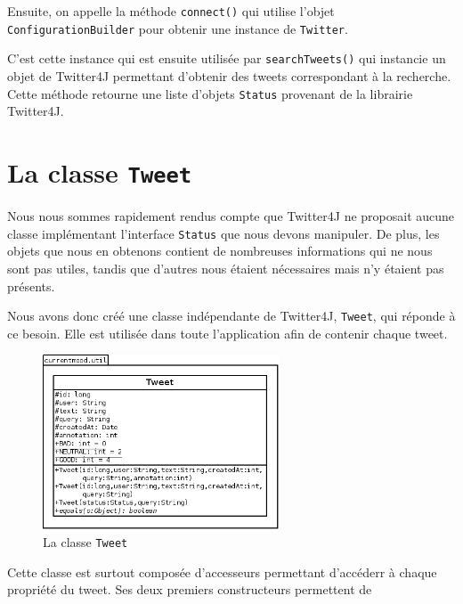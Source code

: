 \documentclass[12pt,a4paper]{report}
\begin{document}
Ensuite, on appelle la méthode \texttt{connect()} qui utilise l'objet
\texttt{ConfigurationBuilder} pour obtenir une instance de \texttt{Twitter}.

C'est cette instance qui est ensuite utilisée par \texttt{searchTweets()} qui
instancie un objet de Twitter4J permettant d'obtenir des tweets correspondant
à la recherche. Cette méthode retourne une liste d'objets \texttt{Status}
provenant de la librairie Twitter4J.

\section{La classe \texttt{Tweet}}

Nous nous sommes rapidement rendus compte que Twitter4J ne proposait aucune
classe implémentant l'interface \texttt{Status} que nous devons manipuler. De
plus, les objets que nous en obtenons contient de nombreuses informations qui ne
nous sont pas utiles, tandis que d'autres nous étaient nécessaires mais
n'y étaient pas présents.

Nous avons donc créé une classe indépendante de Twitter4J, \texttt{Tweet}, qui
réponde à ce besoin. Elle est utilisée dans toute l'application afin de contenir
chaque tweet.

\begin{figure}[b]
    \centering
    \includegraphics[width=7cm]{img/uml_tweet.png}
    \caption{La classe \texttt{Tweet}}
    \label{uml_tweet}
\end{figure}

Cette classe est surtout composée d'accesseurs permettant d'accéderr à chaque
propriété du tweet. Ses deux premiers constructeurs permettent de 
\end{document}
